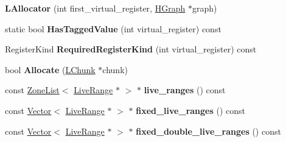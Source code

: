 \begin{DoxyCompactItemize}
\item 
{\bfseries L\+Allocator} (int first\+\_\+virtual\+\_\+register, \hyperlink{classv8_1_1internal_1_1_h_graph}{H\+Graph} $\ast$graph)\hypertarget{classv8_1_1internal_1_1_b_a_s_e___e_m_b_e_d_d_e_d_a0bb693b8cf25eb2d5a2f831a6859e48f}{}\label{classv8_1_1internal_1_1_b_a_s_e___e_m_b_e_d_d_e_d_a0bb693b8cf25eb2d5a2f831a6859e48f}

\item 
static bool {\bfseries Has\+Tagged\+Value} (int virtual\+\_\+register) const \hypertarget{classv8_1_1internal_1_1_b_a_s_e___e_m_b_e_d_d_e_d_a3fcd69a79b54b1f5180bf5475d872bb8}{}\label{classv8_1_1internal_1_1_b_a_s_e___e_m_b_e_d_d_e_d_a3fcd69a79b54b1f5180bf5475d872bb8}

\item 
Register\+Kind {\bfseries Required\+Register\+Kind} (int virtual\+\_\+register) const \hypertarget{classv8_1_1internal_1_1_b_a_s_e___e_m_b_e_d_d_e_d_ae0274c8bc6f0c41cef734cdaae9b72eb}{}\label{classv8_1_1internal_1_1_b_a_s_e___e_m_b_e_d_d_e_d_ae0274c8bc6f0c41cef734cdaae9b72eb}

\item 
bool {\bfseries Allocate} (\hyperlink{classv8_1_1internal_1_1_l_chunk}{L\+Chunk} $\ast$chunk)\hypertarget{classv8_1_1internal_1_1_b_a_s_e___e_m_b_e_d_d_e_d_abf44993571df22e89454f56f35f67e4f}{}\label{classv8_1_1internal_1_1_b_a_s_e___e_m_b_e_d_d_e_d_abf44993571df22e89454f56f35f67e4f}

\item 
const \hyperlink{classv8_1_1internal_1_1_zone_list}{Zone\+List}$<$ \hyperlink{classv8_1_1internal_1_1_live_range}{Live\+Range} $\ast$ $>$ $\ast$ {\bfseries live\+\_\+ranges} () const \hypertarget{classv8_1_1internal_1_1_b_a_s_e___e_m_b_e_d_d_e_d_aebf352a50a05f5198bfe3ec645c238df}{}\label{classv8_1_1internal_1_1_b_a_s_e___e_m_b_e_d_d_e_d_aebf352a50a05f5198bfe3ec645c238df}

\item 
const \hyperlink{classv8_1_1internal_1_1_vector}{Vector}$<$ \hyperlink{classv8_1_1internal_1_1_live_range}{Live\+Range} $\ast$ $>$ $\ast$ {\bfseries fixed\+\_\+live\+\_\+ranges} () const \hypertarget{classv8_1_1internal_1_1_b_a_s_e___e_m_b_e_d_d_e_d_aacb436f3539dde1dc2c7683b0309c90b}{}\label{classv8_1_1internal_1_1_b_a_s_e___e_m_b_e_d_d_e_d_aacb436f3539dde1dc2c7683b0309c90b}

\item 
const \hyperlink{classv8_1_1internal_1_1_vector}{Vector}$<$ \hyperlink{classv8_1_1internal_1_1_live_range}{Live\+Range} $\ast$ $>$ $\ast$ {\bfseries fixed\+\_\+double\+\_\+live\+\_\+ranges} () const \hypertarget{classv8_1_1internal_1_1_b_a_s_e___e_m_b_e_d_d_e_d_a83cf8ffb8d7009cfa985734c54ab4852}{}\label{classv8_1_1internal_1_1_b_a_s_e___e_m_b_e_d_d_e_d_a83cf8ffb8d7009cfa985734c54ab4852}


\end{DoxyCompactItemize}
